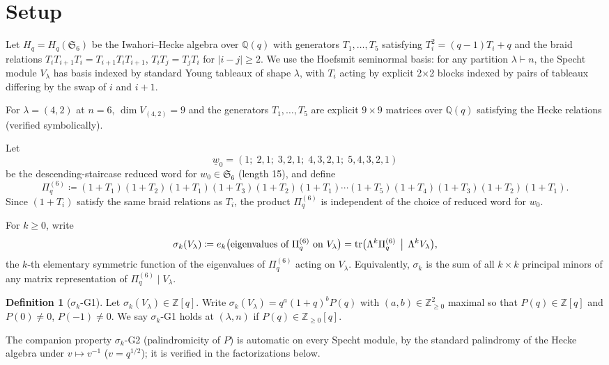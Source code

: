 \documentclass[11pt]{article}
\theoremstyle{plain}
\theoremstyle{definition}
\newtheorem{definition}[theorem]{Definition}
\theoremstyle{remark}
\newcommand{\Z}{\mathbb{Z}}
\newcommand{\Q}{\mathbb{Q}}
\newcommand{\Sym}{\mathfrak{S}}
\newcommand{\Hq}{H_q}
\newcommand{\Pibs}{\Pi_q}
\newcommand{\Vlam}{V_\lambda}
\newcommand{\trace}{\operatorname{tr}}
\begin{document}
\section{Setup}

Let $\Hq = \Hq(\Sym_6)$ be the Iwahori--Hecke algebra over $\Q(q)$ with
generators $T_1,\ldots,T_5$ satisfying $T_i^2 = (q-1)T_i + q$ and the braid
relations $T_i T_{i+1} T_i = T_{i+1} T_i T_{i+1}$, $T_i T_j = T_j T_i$ for
$|i - j| \geq 2$. We use the Hoefsmit seminormal basis: for any partition
$\lambda \vdash n$, the Specht module $V_\lambda$ has basis indexed by
standard Young tableaux of shape $\lambda$, with $T_i$ acting by explicit
2$\times$2 blocks indexed by pairs of tableaux differing by the swap of $i$
and $i+1$.

For $\lambda = (4,2)$ at $n = 6$, $\dim V_{(4,2)} = 9$ and the generators
$T_1, \ldots, T_5$ are explicit $9 \times 9$ matrices over $\Q(q)$ satisfying
the Hecke relations (verified symbolically).

Let
\[
\underline{w}_0 = (1;\; 2,1;\; 3,2,1;\; 4,3,2,1;\; 5,4,3,2,1)
\]
be the descending-staircase reduced word for $w_0 \in \Sym_6$ (length 15),
and define
\begin{equation}\label{eq:Pi-def}
\Pibs^{(6)} \coloneqq (1+T_1)(1+T_2)(1+T_1)(1+T_3)(1+T_2)(1+T_1)\cdots(1+T_5)(1+T_4)(1+T_3)(1+T_2)(1+T_1).
\end{equation}
Since $(1+T_i)$ satisfy the same braid relations as $T_i$, the product
$\Pibs^{(6)}$ is independent of the choice of reduced word for $w_0$.

For $k \geq 0$, write
\[
\sigma_k(\Vlam) \coloneqq e_k\bigl(\text{eigenvalues of } \Pibs^{(6)} \text{ on } \Vlam\bigr) = \trace\bigl(\Lambda^k \Pibs^{(6)} \,\bigm|\, \Lambda^k \Vlam\bigr),
\]
the $k$-th elementary symmetric function of the eigenvalues of $\Pibs^{(6)}$
acting on $V_\lambda$. Equivalently, $\sigma_k$ is the sum of all
$k \times k$ principal minors of any matrix representation of
$\Pibs^{(6)} \mid V_\lambda$.

\begin{definition}[$\sigma_k$-G1]
Let $\sigma_k(\Vlam) \in \Z[q]$. Write $\sigma_k(\Vlam) = q^{a}(1+q)^{b} P(q)$
with $(a,b) \in \Z_{\geq 0}^2$ maximal so that $P(q) \in \Z[q]$ and
$P(0) \neq 0$, $P(-1) \neq 0$. We say $\sigma_k$-G1 holds at
$(\lambda, n)$ if $P(q) \in \Z_{\geq 0}[q]$.
\end{definition}

The companion property $\sigma_k$-G2 (palindromicity of $P$) is automatic
on every Specht module, by the standard palindromy of the Hecke algebra
under $v \mapsto v^{-1}$ ($v = q^{1/2}$); it is verified in the
factorizations below.
\end{document}
